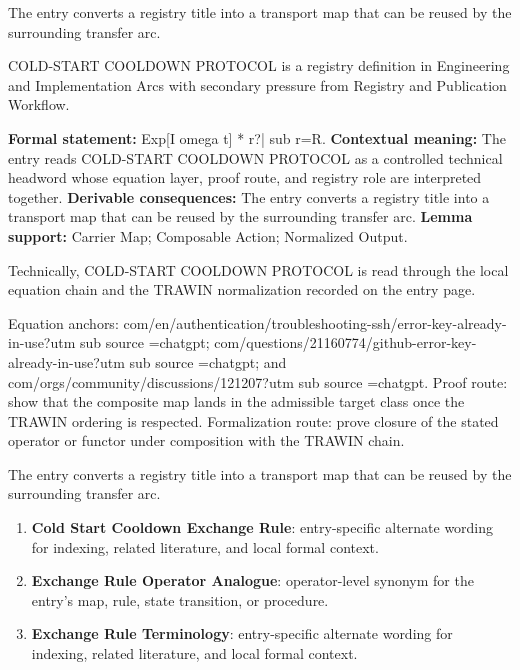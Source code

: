 The entry converts a registry title into a transport map that can be reused by the surrounding transfer arc.
\clearpage


\begingroup\small
{}
COLD-START COOLDOWN PROTOCOL is a registry definition in Engineering and Implementation Arcs with secondary pressure from Registry and Publication Workflow.

\begingroup\footnotesize\setlength{\emergencystretch}{3em}\sloppy
\textbf{Formal statement:} Exp[I omega t] * r?| sub r=R. \textbf{Contextual meaning:} The entry reads COLD-START COOLDOWN PROTOCOL as a controlled technical headword whose equation layer, proof route, and registry role are interpreted together. \textbf{Derivable consequences:} The entry converts a registry title into a transport map that can be reused by the surrounding transfer arc. \textbf{Lemma support:} Carrier Map; Composable Action; Normalized Output.\par
\endgroup

Technically, COLD-START COOLDOWN PROTOCOL is read through the local equation chain and the TRAWIN normalization recorded on the entry page.

Equation anchors: com/en/authentication/troubleshooting-ssh/error-key-already-in-use?utm sub source =chatgpt; com/questions/21160774/github-error-key-already-in-use?utm sub source =chatgpt; and com/orgs/community/discussions/121207?utm sub source =chatgpt. Proof route: show that the composite map lands in the admissible target class once the TRAWIN ordering is respected. Formalization route: prove closure of the stated operator or functor under composition with the TRAWIN chain.

The entry converts a registry title into a transport map that can be reused by the surrounding transfer arc.
\endgroup

\begin{enumerate}[leftmargin=1.6em,itemsep=6pt,topsep=4pt]
\item \textbf{Cold Start Cooldown Exchange Rule}: entry-specific alternate wording for indexing, related literature, and local formal context.
\item \textbf{Exchange Rule Operator Analogue}: operator-level synonym for the entry's map, rule, state transition, or procedure.
\item \textbf{Exchange Rule Terminology}: entry-specific alternate wording for indexing, related literature, and local formal context.
\end{enumerate}

